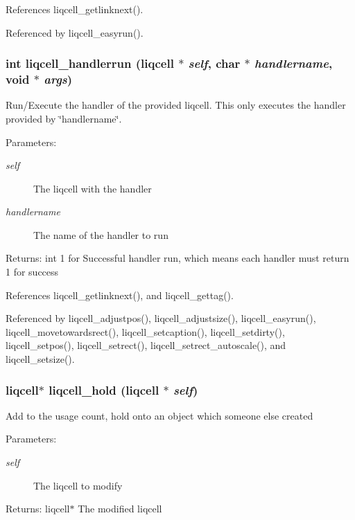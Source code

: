 References liqcell\_\-getlinknext().

Referenced by liqcell\_\-easyrun().
\subsubsection[{liqcell\_\-handlerrun}]{\setlength{\rightskip}{0pt plus 5cm}int liqcell\_\-handlerrun (liqcell $\ast$ {\em self}, \/  char $\ast$ {\em handlername}, \/  void $\ast$ {\em args})}\label{d5/da2/liqcell_8c_188ff9834000eb5e0ac59505019165ab}


Run/Execute the handler of the provided liqcell. This only executes the handler provided by \char`\"{}handlername\char`\"{}.

\begin{Desc}
\item[Parameters:]
\begin{description}
\item[{\em self}]The liqcell with the handler \item[{\em handlername}]The name of the handler to run \end{description}
\end{Desc}
\begin{Desc}
\item[Returns:]int 1 for Successful handler run, which means each handler must return 1 for success \end{Desc}


References liqcell\_\-getlinknext(), and liqcell\_\-gettag().

Referenced by liqcell\_\-adjustpos(), liqcell\_\-adjustsize(), liqcell\_\-easyrun(), liqcell\_\-movetowardsrect(), liqcell\_\-setcaption(), liqcell\_\-setdirty(), liqcell\_\-setpos(), liqcell\_\-setrect(), liqcell\_\-setrect\_\-autoscale(), and liqcell\_\-setsize().
\subsubsection[{liqcell\_\-hold}]{\setlength{\rightskip}{0pt plus 5cm}liqcell$\ast$ liqcell\_\-hold (liqcell $\ast$ {\em self})}\label{d5/da2/liqcell_8c_bc3790ff5b66a6dece3e4c237a16b419}


Add to the usage count, hold onto an object which someone else created \begin{Desc}
\item[Parameters:]
\begin{description}
\item[{\em self}]The liqcell to modify \end{description}
\end{Desc}
\begin{Desc}
\item[Returns:]liqcell$\ast$ The modified liqcell \end{Desc}


